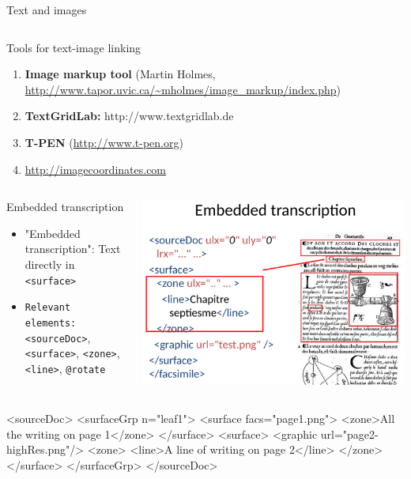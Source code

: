 \begin{frame}{Text and images}
\begin{columns}
\begin{block}{Tools for text-image linking}
\begin{enumerate}\footnotesize
\item  \textbf{Image markup tool} (Martin Holmes, \protect\url{http://www.tapor.uvic.ca/~mholmes/image_markup/index.php})
\item  \textbf{TextGridLab:} http://www.textgridlab.de
\item  \textbf{T-PEN} (\protect\url{http://www.t-pen.org})
\item \protect\url{http://imagecoordinates.com}
\end{enumerate}
\end{block}
\end{columns}

\framebreak


\begin{columns}
\begin{block}{Embedded transcription}
\begin{itemize}\footnotesize
\item  "Embedded transcription": Text directly in \texttt{<surface>}
\item  \texttt{Relevant elements:} \texttt{<sourceDoc>}, \texttt{<surface>}, \texttt{<zone>}, \texttt{<line>}, \texttt{@rotate}
\end{itemize}
\end{block}

\includegraphics[width=\textwidth]{img/facs-embedded.png}
\end{columns}

\begin{xmlcode}
<sourceDoc>
 <surfaceGrp n="leaf1">
  <surface facs="page1.png"> <zone>All the writing on page 1</zone> </surface>
  <surface>
   <graphic url="page2-highRes.png"/>
   <zone> <line>A line of writing on page 2</line> </zone>
  </surface>
 </surfaceGrp>
</sourceDoc>
\end{xmlcode}

\end{frame}


